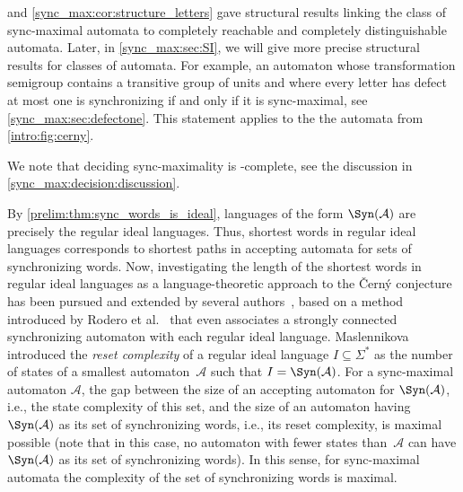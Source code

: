
  and \cref{sync_max:cor:structure_letters}
 gave structural results linking the class of sync-maximal automata
 to completely reachable and completely distinguishable automata.
 Later, in \cref{sync_max:sec:SI}, we will give more precise
 structural results for classes of automata.
 For example, an automaton whose transformation semigroup contains
 a transitive group of units and where every letter has defect at most one is synchronizing
 if and only if it is sync-maximal, see \cref{sync_max:sec:defectone}.
 This statement applies to the the \Cerny automata from \cref{intro:fig:cerny}.
 
We note that deciding sync-maximality is \PSPACE-complete, see
the discussion in \cref{sync_max:decision:discussion}.

By \cref{prelim:thm:sync_words_is_ideal}, languages of the form $\Syn(\mathcal A)$ are precisely the regular ideal languages.
Thus, shortest words in regular ideal languages corresponds
to shortest paths in accepting automata for sets of synchronizing words.
Now, investigating the length of the shortest words in regular ideal languages as a language-theoretic approach to the \v{C}ern\'{y} conjecture has been pursued and extended by several authors~\cite{DBLP:journals/ijfcs/AlmeidaR16,DBLP:journals/jalc/FrigeriR25,DBLP:journals/jalc/FrigeriR19,DBLP:journals/fuin/MaslennikovaR18,DBLP:journals/iandc/PribavkinaR11,ReisR16,DBLP:journals/aam/Rodaro18}, based on a method introduced by Rodero et al.~\cite{DBLP:journals/fuin/MaslennikovaR18,ReisR16,DBLP:journals/aam/Rodaro18} that even associates a strongly connected synchronizing automaton with each regular ideal language.
Maslennikova~\cite{DBLP:journals/corr/Maslennikova14,DBLP:journals/ijfcs/Maslennikova19} 
introduced the \emph{reset complexity} 
of a regular ideal language $I \subseteq \Sigma^*$ 
as the number of states of a smallest automaton~$\mathcal A$ 
such that $I = \Syn(\mathcal A)$.
For a sync-maximal automaton $\mathcal A$,
the gap between the size of an accepting automaton for $\Syn(\mathcal A)$, i.e., the state complexity of this set,
and the size of an automaton having $\Syn(\mathcal A)$ as its set of synchronizing words, i.e., its reset complexity,
is maximal possible (note that in this case, no automaton with fewer states than~$\mathcal A$ can have $\Syn(\mathcal A)$
as its set of synchronizing words).
In this sense, for sync-maximal automata the complexity of the set of synchronizing words is maximal.